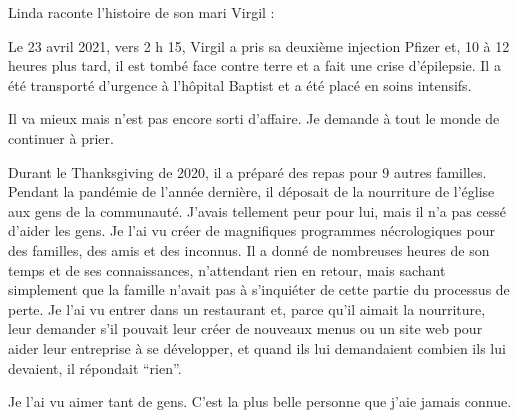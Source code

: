 Linda raconte l'histoire de son mari Virgil :

Le 23 avril 2021, vers 2 h 15, Virgil a pris sa deuxième injection Pfizer et, 10
à 12 heures plus tard, il est tombé face contre terre et a fait une crise
d'épilepsie. Il a été transporté d'urgence à l'hôpital Baptist et a été placé en
soins intensifs.

Il va mieux mais n'est pas encore sorti d'affaire. Je demande à tout le monde de
continuer à prier.

Durant le Thanksgiving de 2020, il a préparé des repas pour 9 autres
familles. Pendant la pandémie de l'année dernière, il déposait de la nourriture
de l'église aux gens de la communauté. J'avais tellement peur pour lui, mais il
n'a pas cessé d'aider les gens. Je l'ai vu créer de magnifiques programmes
nécrologiques pour des familles, des amis et des inconnus. Il a donné de
nombreuses heures de son temps et de ses connaissances, n'attendant rien en
retour, mais sachant simplement que la famille n'avait pas à s'inquiéter de
cette partie du processus de perte. Je l'ai vu entrer dans un restaurant et,
parce qu'il aimait la nourriture, leur demander s'il pouvait leur créer de
nouveaux menus ou un site web pour aider leur entreprise à se développer, et
quand ils lui demandaient combien ils lui devaient, il répondait “rien”.

Je l'ai vu aimer tant de gens. C'est la plus belle personne que j'aie jamais
connue.

